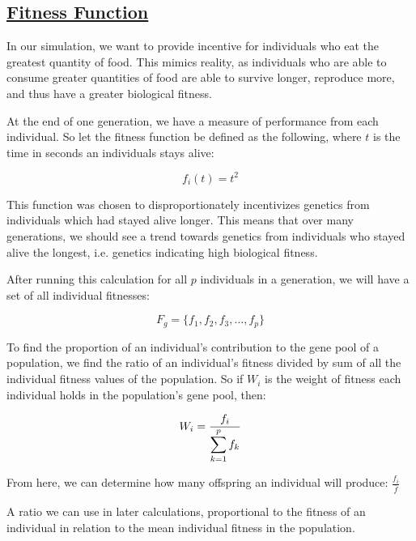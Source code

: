 \newpage
\subsection{\underline{Fitness Function}}

In our simulation, we want to provide incentive for individuals who eat the greatest quantity of food. This mimics reality, as individuals who are able to consume greater quantities of food are able to survive longer, reproduce more, and thus have a greater biological fitness.

\ms
\nid At the end of one generation, we have a measure of performance from each individual. So let the fitness function be defined as the following, where $t$ is the time in seconds an individuals stays alive:

$$f_i(t)=t^2$$

\ms
\nid This function was chosen to disproportionately incentivizes genetics from individuals which had stayed alive longer. This means that over many generations, we should see a trend towards genetics from individuals who stayed alive the longest, i.e. genetics indicating high biological fitness. 

\ms
\nid After running this calculation for all $p$ individuals in a generation, we will have a set of all individual fitnesses:

$$
F_g=\{f_1, f_2, f_3, \ldots, f_{p}\}
$$

\nid To find the proportion of an individual's contribution to the gene pool of a population, we find the ratio of an individual's fitness divided by sum of all the individual fitness values of the population. So if $W_i$ is the weight of fitness each individual holds in the population's gene pool, then:

$$
W_i=\frac{f_i}{\mathlarger{\sum_{k=1}^{p} f_k}}
$$

\nid From here, we can determine how many offspring an individual will produce: 
$\frac{f_i}{\bar{f}}$
\bi
\item A ratio we can use in later calculations, proportional to the fitness of an individual in relation to the mean individual fitness in the population.
\ei

